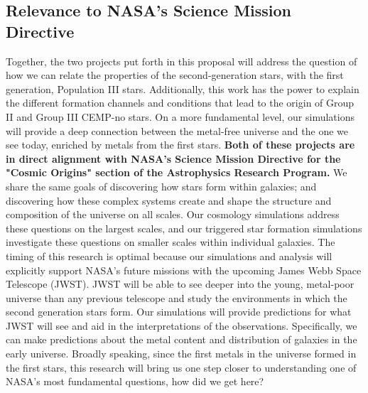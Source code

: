 \documentclass[a4paper, 12pt]{article}
\begin{document}
\subsection{Relevance to NASA's Science Mission Directive}
Together, the two projects put forth in this proposal will address the question of how we can relate the properties of the second-generation stars, with the first generation, Population III stars. Additionally, this work has the power to explain the different formation channels and conditions that lead to the origin of Group II and Group III CEMP-no stars. On a more fundamental level, our simulations will provide a deep connection between the metal-free universe and the one we see today, enriched by metals from the first stars. \textbf{Both of these projects are in direct alignment with NASA's Science Mission Directive for the "Cosmic Origins" section of the Astrophysics Research Program.} We share the same goals of discovering how stars form within galaxies; and discovering how these complex systems create and shape the structure and composition of the universe on all scales. Our cosmology simulations address these questions on the largest scales, and our triggered star formation simulations investigate these questions on smaller scales within individual galaxies. The timing of this research is optimal because our simulations and analysis will explicitly support NASA's future missions with the upcoming James Webb Space Telescope (JWST). JWST will be able to see deeper into the young, metal-poor universe than any previous telescope and study the environments in which the second generation stars form. Our simulations will provide predictions for what JWST will see and aid in the interpretations of the observations. Specifically, we can make predictions about the metal content and distribution of galaxies in the early universe. Broadly speaking, since the first metals in the universe formed in the first stars, this research will bring us one step closer to understanding one of NASA's most fundamental questions, how did we get here?


\end{document}
